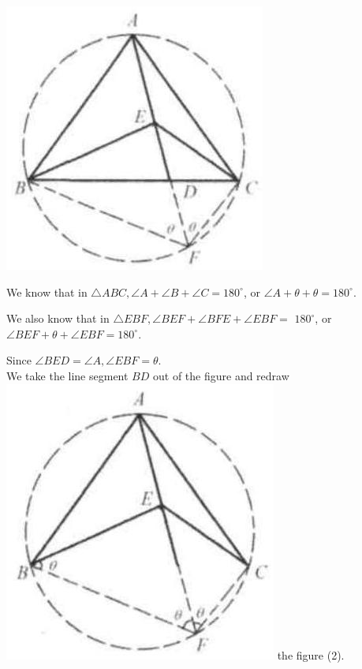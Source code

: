 \documentclass[10pt]{article}
\begin{document}
\includegraphics[max width=\textwidth, center]{2025_04_17_97bc1f7e44d93c271a88g-202}

We know that in \(\triangle A B C, \angle A+\angle B+\angle C=180^{\circ}\), or \(\angle A+\theta+\theta=180^{\circ}\).

We also know that in \(\triangle E B F, \angle B E F+\angle B F E+\angle E B F=\) \(180^{\circ}\), or \(\angle B E F+\theta+\angle E B F=180^{\circ}\).

Since \(\angle B E D=\angle A, \angle E B F=\theta\).\\
We take the line segment \(B D\) out of the figure and redraw\\
\includegraphics[max width=\textwidth]{2025_04_17_97bc1f7e44d93c271a88g-202(1)} the figure (2).
\end{document}
